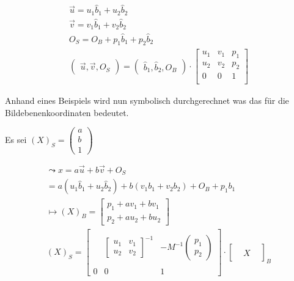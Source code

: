 		\begin{gather}
		\vec{u} = u_1 \hat{b}_1 + u_2 \hat{b}_2\\
		\vec{v} = v_1 \hat{b}_1 + v_2 \hat{b}_2\\
		O_S = O_B +p_1 \hat{b}_1 + p_2 \hat{b}_2\\
		\begin{pmatrix}
		\vec{u}, \vec{v}, O_S
		\end{pmatrix}		
		=
		\begin{pmatrix}
		\hat{b}_1, \hat{b}_2, O_B 
		\end{pmatrix}\cdot	
		\begin{bmatrix}
		u_1&v_1&p_1\\u_2&v_2&p_2\\0&0&1\\
		\end{bmatrix}
		\end{gather}
		
		Anhand eines Beispiels wird nun symbolisch durchgerechnet was das für die Bildebenenkoordinaten bedeutet. 
		
		Es sei $(X)_S=\begin{pmatrix}
		a\\b\\1
		\end{pmatrix}$
		
		\begin{gather}
		\leadsto x = a \vec{u} + b \vec{v} + O_S\\
		= a (u_1 \hat{b}_1 + u_2 \hat{b}_2) +b(v_1 b_1 + v_2 b_2) + O_B + p_1 b_1\\
		\mapsto (X)_B = \begin{bmatrix}
		p_1 + a v_1 + b v_1\\
		p_2 + a u_2 + b u_2
		\end{bmatrix}\\
		(X)_S =
		\begin{bmatrix}
		&  & \\
		&\begin{bmatrix}
		u_1& v_1\\
		u_2& v_2
		\end{bmatrix}^{-1}  & -M^{-1}\begin{pmatrix}
		p_1\\p_2
		\end{pmatrix} \\ 
		&  & \\
		0&0 & 1
		\end{bmatrix}
		\cdot
		\begin{bmatrix}
		&&\\
		&X&\\
		&&
		\end{bmatrix}_B	
		\end{gather}\\
		
